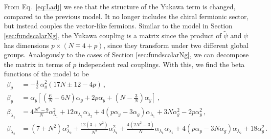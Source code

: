 From Eq.~\eqref{eq:Ladj} we see that the structure of the Yukawa term is changed, compared to the previous model. It no longer includes the chiral fermionic sector, but instead couples the vector-like fermions. Similar to the model in Section \ref{sec:fundscalarNg}, the Yukawa coupling is a matrix since the product of $\tilde\psi$ and $\psi$ has dimensions $p\times (N\mp 4+p)$, since they transform under two different global groups. Analogously to the cases of Section \ref{sec:fundscalarNg}, we can decompose the matrix in terms of $p$ independent real couplings. With this, we find the beta functions of the model to be 
\begin{align}
    \beta_g&=-\frac{1}{3}\,\alpha_g^2\left(17N \pm 12 -4p\right)\,,\\
    \beta_{y}&=\alpha_y\left[\left(\frac 6N-6N\right) \alpha_g+ 2p \alpha_{y}+ \left(N-\frac 3N\right)\alpha_y\right]\,, \label{eq:betaYadj}\\
    \beta_{\lambda_1} &=4\frac{N^2-9}{N}\alpha_{\lambda_1}^2+12\alpha_{\lambda_1}\alpha_{\lambda_2}+4(p\alpha_{y}-3\alpha_{g})\alpha_{\lambda_1}+3N\alpha_g^2-2p\alpha_{y}^2\,,\label{eq:betalamadj1}
    \\
    \beta_{{\lambda_2}}&=(7+N^2)\alpha_{\lambda_2}^2+\frac{12(3+N^2)}{N^2}\alpha_{\lambda_1}^2+\frac{4(2N^2-3)}{N}\alpha_{\lambda_1}\alpha_{\lambda_2}+4(p\alpha_{y}-3N\alpha_{g})\alpha_{\lambda_2}+18\alpha_{g}^2\,.\label{eq:betalamadj2}
\end{align}
